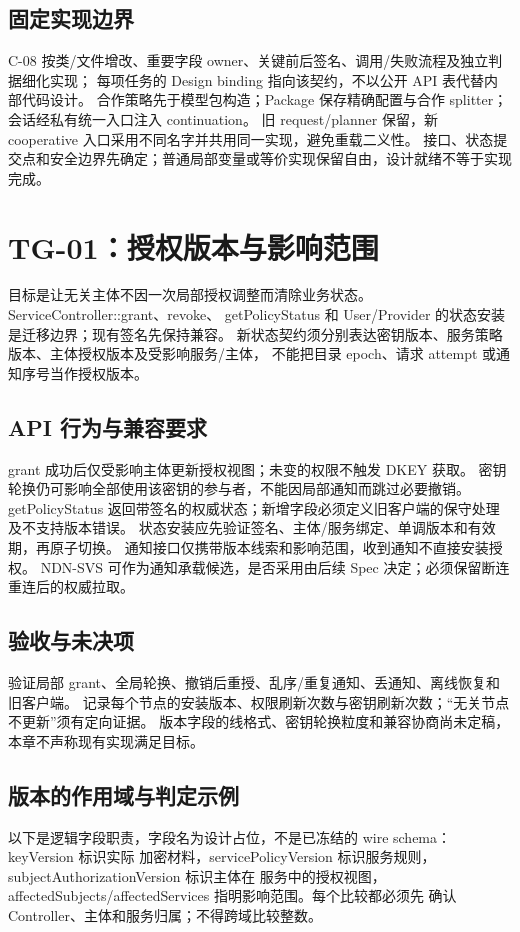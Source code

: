 \subsection{固定实现边界}
C-08 按类/文件增改、重要字段 owner、关键前后签名、调用/失败流程及独立判据细化实现；
每项任务的 Design binding 指向该契约，不以公开 API 表代替内部代码设计。
合作策略先于模型包构造；Package 保存精确配置与合作 splitter；会话经私有统一入口注入 continuation。
旧 request/planner 保留，新 cooperative 入口采用不同名字并共用同一实现，避免重载二义性。
接口、状态提交点和安全边界先确定；普通局部变量或等价实现保留自由，设计就绪不等于实现完成。

\section{TG-01：授权版本与影响范围}
目标是让无关主体不因一次局部授权调整而清除业务状态。ServiceController::grant、revoke、
getPolicyStatus 和 User/Provider 的状态安装是迁移边界；现有签名先保持兼容。
新状态契约须分别表达密钥版本、服务策略版本、主体授权版本及受影响服务/主体，
不能把目录 epoch、请求 attempt 或通知序号当作授权版本。

\subsection{API 行为与兼容要求}
grant 成功后仅受影响主体更新授权视图；未变的权限不触发 DKEY 获取。
密钥轮换仍可影响全部使用该密钥的参与者，不能因局部通知而跳过必要撤销。
getPolicyStatus 返回带签名的权威状态；新增字段必须定义旧客户端的保守处理及不支持版本错误。
状态安装应先验证签名、主体/服务绑定、单调版本和有效期，再原子切换。
通知接口仅携带版本线索和影响范围，收到通知不直接安装授权。
NDN-SVS 可作为通知承载候选，是否采用由后续 Spec 决定；必须保留断连重连后的权威拉取。

\subsection{验收与未决项}
验证局部 grant、全局轮换、撤销后重授、乱序/重复通知、丢通知、离线恢复和旧客户端。
记录每个节点的安装版本、权限刷新次数与密钥刷新次数；“无关节点不更新”须有定向证据。
版本字段的线格式、密钥轮换粒度和兼容协商尚未定稿，本章不声称现有实现满足目标。

\subsection{版本的作用域与判定示例}
以下是逻辑字段职责，字段名为设计占位，不是已冻结的 wire schema：keyVersion 标识实际
加密材料，servicePolicyVersion 标识服务规则，subjectAuthorizationVersion 标识主体在
服务中的授权视图，affectedSubjects/affectedServices 指明影响范围。每个比较都必须先
确认 Controller、主体和服务归属；不得跨域比较整数。

